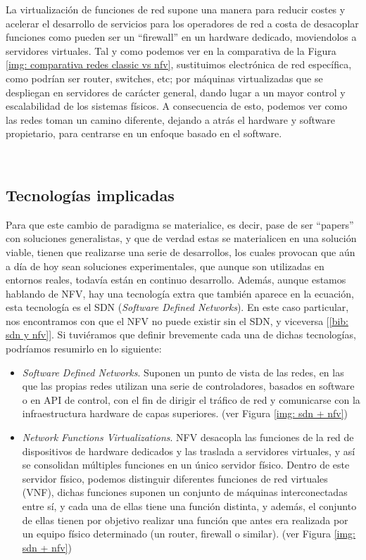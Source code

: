 \documentclass[12pt]{article}
\begin{document}
	\noindent La virtualización de funciones de red supone una manera para reducir costes y acelerar el desarrollo de servicios para los operadores de red a costa de desacoplar funciones como pueden ser un ``firewall'' en un hardware dedicado, moviendolos a servidores virtuales. Tal y como podemos ver en la comparativa de la Figura \ref{img: comparativa redes classic vs nfv}, sustituimos electrónica de red específica, como podrían ser router, switches, etc; por máquinas virtualizadas que se despliegan en servidores de carácter general, dando lugar a un mayor control y escalabilidad de los sistemas físicos. A consecuencia de esto, podemos ver como las redes toman un camino diferente, dejando a atrás el hardware y software propietario, para centrarse en un enfoque basado en el software. \\
	
	\pagebreak
	
\	\subsection{Tecnologías implicadas}
	\noindent Para que este cambio de paradigma se materialice, es decir, pase de ser ``papers'' con soluciones generalistas, y que de verdad estas se materialicen en una solución viable, tienen que realizarse una serie de desarrollos, los cuales provocan que aún a día de hoy sean soluciones experimentales, que aunque son utilizadas en entornos reales, todavía están en continuo desarrollo. Además, aunque estamos hablando de NFV, hay una tecnología extra que también aparece en la ecuación, esta tecnología es el SDN (\textit{Software Defined Networks}). En este caso particular, nos encontramos con que el NFV no puede existir sin el SDN, y viceversa [\ref{bib: sdn y nfv}]. Si tuviéramos que definir brevemente cada una de dichas tecnologías, podríamos resumirlo en lo siguiente:
	\begin{itemize}
		\item \textit{Software Defined Networks}. Suponen un punto de vista de las redes, en las que las propias redes utilizan una serie de controladores, basados en software o en API de control, con el fin de dirigir el tráfico de red y comunicarse con la infraestructura hardware de capas superiores. (ver Figura \ref{img: sdn + nfv})
		 
		\item \textit{Network Functions Virtualizations}. NFV desacopla las funciones de la red de dispositivos de hardware dedicados y las traslada a servidores virtuales, y así se consolidan múltiples funciones en un único servidor físico. Dentro de este servidor físico, podemos distinguir diferentes funciones de red virtuales (VNF), dichas funciones suponen un conjunto de máquinas interconectadas entre sí, y cada una de ellas tiene una función distinta, y además, el conjunto de ellas tienen por objetivo realizar una función que antes era realizada por un equipo físico determinado (un router, firewall o similar). (ver Figura \ref{img: sdn + nfv})
	\end{itemize}
\end{document}
